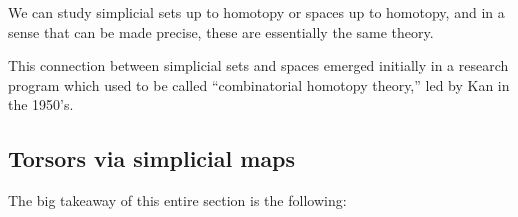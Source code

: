 \documentclass[11pt,openany]{book}
\begin{document}
\begin{remark} We can study simplicial sets up to homotopy or spaces up to homotopy, and in a sense that can be made precise, these are essentially the same theory.
\end{remark}

\begin{remark} This connection between simplicial sets and spaces emerged initially in a research program which used to be called ``combinatorial homotopy theory,'' led by Kan in the 1950's. %
\end{remark}





\subsection{Torsors via simplicial maps}

The big takeaway of this entire section is the following:
\end{document}
